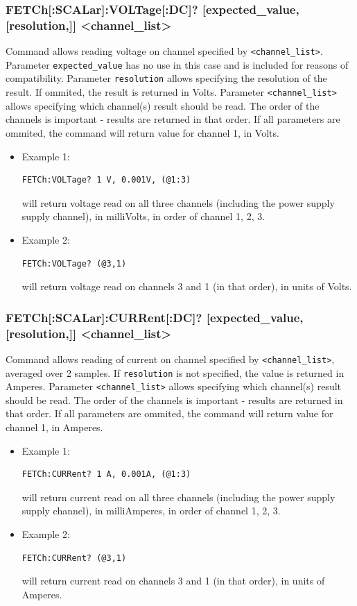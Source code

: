 \documentclass[a4paper,10pt]{article}
\begin{document}
		\subsubsection{FETCh[:SCALar]:VOLTage[:DC]? [expected\_value, [resolution,]] <channel\_list>}
		        Command allows reading voltage on channel specified by \verb|<channel_list>|. Parameter \verb|expected_value| has no use in this case and is included for reasons of compatibility. Parameter \verb|resolution| allows specifying the resolution of the result. If ommited, the result is returned in Volts. Parameter \verb|<channel_list>| allows specifying which channel(s) result should be read. The order of the channels is important - results are returned in that order.
		        \newline If all parameters are ommited, the command will return value for channel 1, in Volts.
		        \begin{itemize}
		            \item Example 1:
		                \begin{verbatim}FETCh:VOLTage? 1 V, 0.001V, (@1:3)\end{verbatim} will return voltage read on all three channels (including the power supply supply channel), in milliVolts, in order of channel 1, 2, 3.
		            \item Example 2:
		                \begin{verbatim}FETCh:VOLTage? (@3,1)\end{verbatim} will return voltage read on channels 3 and 1 (in that order), in units of Volts.
		        \end{itemize}
		\subsubsection{FETCh[:SCALar]:CURRent[:DC]? [expected\_value, [resolution,]] <channel\_list>}
		        Command allows reading of current on channel specified by \verb|<channel_list>|, averaged over 2 samples. If \verb|resolution| is not specified, the value is returned in Amperes.
		        Parameter \verb|<channel_list>| allows specifying which channel(s) result should be read. The order of the channels is important - results are returned in that order.
		        \newline If all parameters are ommited, the command will return value for channel 1, in Amperes.
		        \begin{itemize}
		            \item Example 1:
		                \begin{verbatim}FETCh:CURRent? 1 A, 0.001A, (@1:3)\end{verbatim} will return current read on all three channels (including the power supply supply channel), in milliAmperes, in order of channel 1, 2, 3.
		            \item Example 2:
		                \begin{verbatim}FETCh:CURRent? (@3,1)\end{verbatim} will return current read on channels 3 and 1 (in that order), in units of Amperes.
		        \end{itemize}
\end{document}
